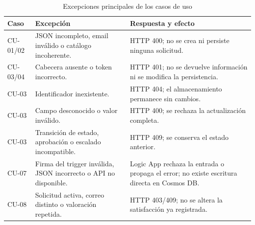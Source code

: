 \begin{table}[ht]
\centering
\scriptsize
\begin{tabularx}{\textwidth}{l X X}
\textbf{Caso} & \textbf{Excepción} & \textbf{Respuesta y efecto} \\
\hline
CU-01/02 & JSON incompleto, email inválido o catálogo incoherente. & HTTP 400; no se crea ni persiste ninguna solicitud. \\
CU-03/04 & Cabecera ausente o token incorrecto. & HTTP 401; no se devuelve información ni se modifica la persistencia. \\
CU-03 & Identificador inexistente. & HTTP 404; el almacenamiento permanece sin cambios. \\
CU-03 & Campo desconocido o valor inválido. & HTTP 400; se rechaza la actualización completa. \\
CU-03 & Transición de estado, aprobación o escalado incompatible. & HTTP 409; se conserva el estado anterior. \\
CU-07 & Firma del trigger inválida, JSON incorrecto o API no disponible. & Logic App rechaza la entrada o propaga el error; no existe escritura directa en Cosmos DB. \\
CU-08 & Solicitud activa, correo distinto o valoración repetida. & HTTP 403/409; no se altera la satisfacción ya registrada. \\
\end{tabularx}
\caption{Excepciones principales de los casos de uso}
\label{tabla:excepciones-casos-uso}
\end{table}
